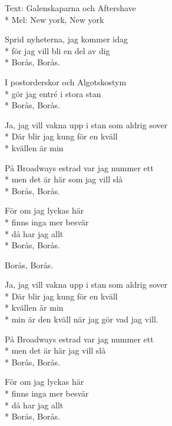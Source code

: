 \begin{SongText}
    \begin{SongInfo}
        Text: Galenskaparna och Aftershave\\*%
        Mel: New york, New york
    \end{SongInfo}
    \begin{SongVerse}
        Sprid nyheterna, jag kommer idag\\*%
        för jag vill bli en del av dig\\*%
        Borås, Borås.
    \end{SongVerse}
    \begin{SongVerse}
        I postorderskor och Algotskostym\\*%
        gör jag entré i stora stan\\*%
        Borås, Borås.
    \end{SongVerse}
    \begin{SongVerse}
        Ja, jag vill vakna upp i stan som aldrig sover\\*%
        Där blir jag kung för en kväll\\*%
        kvällen är min
    \end{SongVerse}
    \begin{SongVerse}
        På Broadways estrad var jag nummer ett\\*%
        men det är här som jag vill slå\\*%
        Borås, Borås.
    \end{SongVerse}
    \begin{SongVerse}
        För om jag lyckas här\\*%
        finns inga mer besvär\\*%
        då har jag allt\\*%
        Borås, Borås.
    \end{SongVerse}
    \begin{SongVerse}
        Borås, Borås.
    \end{SongVerse}
    \begin{SongVerse}
        Ja, jag vill vakna upp i stan som aldrig sover\\*%
        Där blir jag kung för en kväll\\*%
        kvällen är min\\*%
        min är den kväll när jag gör vad jag vill.
    \end{SongVerse}
    \begin{SongVerse}
        På Broadways estrad var jag nummer ett\\*%
        men det är här jag vill slå\\*%
        Borås, Borås.
    \end{SongVerse}
    \begin{SongVerse}
        För om jag lyckas här\\*%
        finns inga mer besvär\\*%
        då har jag allt\\*%
        Borås, Borås.
    \end{SongVerse}
\end{SongText}
